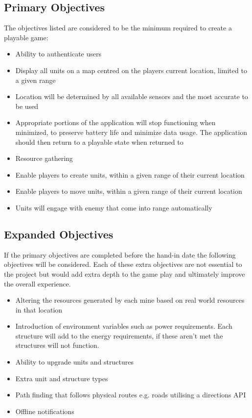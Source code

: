 \subsection{Primary Objectives}
The objectives listed are considered to be the minimum required to create a playable game:
\begin{itemize}
\item Ability to authenticate users
\item Display all units on a map centred on the players current location, limited to a given range
\item Location will be determined by all available sensors and the most accurate to be used
\item Appropriate portions of the application will stop functioning when minimized, to preserve battery life and minimize data usage. The application should then return to a playable state when returned to
\item Resource gathering
\item Enable players to create units, within a given range of their current location
\item Enable players to move units, within a given range of their current location
\item Units will engage with enemy that come into range automatically
\end{itemize} 

\subsection{Expanded Objectives}
If the primary objectives are completed before the hand-in date the following objectives will be considered. Each of these extra objectives are not essential to the project but would add extra depth to the game play and ultimately improve the overall experience.
\begin{itemize}
\item Altering the resources generated by each mine based on real world resources in that location
\item Introduction of environment variables such as power requirements. Each structure will add to the energy requirements, if these aren't met the structures will not function.
\item Ability to upgrade units and structures
\item Extra unit and structure types
\item Path finding that follows physical routes e.g. roads utilising a directions API
\item Offline notifications
\end{itemize}


